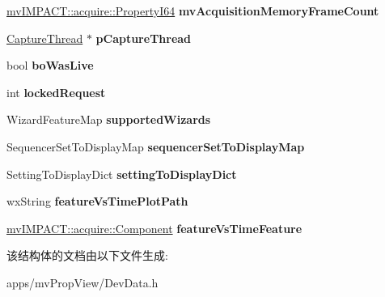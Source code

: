 \begin{DoxyCompactItemize}
\item 
\hypertarget{struct_device_data_ace53e0222e59fd8e5cb0c2d84b60f0eb}{\hyperlink{group___common_interface_ga81749b2696755513663492664a18a893}{mv\+I\+M\+P\+A\+C\+T\+::acquire\+::\+Property\+I64} {\bfseries mv\+Acquisition\+Memory\+Frame\+Count}}\label{struct_device_data_ace53e0222e59fd8e5cb0c2d84b60f0eb}

\item 
\hypertarget{struct_device_data_abc9206b7b98a152655be5a3f31e7a9be}{\hyperlink{class_capture_thread}{Capture\+Thread} $\ast$ {\bfseries p\+Capture\+Thread}}\label{struct_device_data_abc9206b7b98a152655be5a3f31e7a9be}

\item 
\hypertarget{struct_device_data_a2aad1b99064e7d1a60874f427db97de6}{bool {\bfseries bo\+Was\+Live}}\label{struct_device_data_a2aad1b99064e7d1a60874f427db97de6}

\item 
\hypertarget{struct_device_data_a968933b3002f09304fa3caa3cdd032b8}{int {\bfseries locked\+Request}}\label{struct_device_data_a968933b3002f09304fa3caa3cdd032b8}

\item 
\hypertarget{struct_device_data_a88101971c4324566651169d882baf05f}{Wizard\+Feature\+Map {\bfseries supported\+Wizards}}\label{struct_device_data_a88101971c4324566651169d882baf05f}

\item 
\hypertarget{struct_device_data_ad9e5ebb64e855bbd6c728a25f30437bc}{Sequencer\+Set\+To\+Display\+Map {\bfseries sequencer\+Set\+To\+Display\+Map}}\label{struct_device_data_ad9e5ebb64e855bbd6c728a25f30437bc}

\item 
\hypertarget{struct_device_data_a70993acd1f4619c9d6cb8afcb12aac42}{Setting\+To\+Display\+Dict {\bfseries setting\+To\+Display\+Dict}}\label{struct_device_data_a70993acd1f4619c9d6cb8afcb12aac42}

\item 
\hypertarget{struct_device_data_a18817b8d303bdc00a4c17b3e3c9d7602}{wx\+String {\bfseries feature\+Vs\+Time\+Plot\+Path}}\label{struct_device_data_a18817b8d303bdc00a4c17b3e3c9d7602}

\item 
\hypertarget{struct_device_data_a648ef0e198ca83fafdc89d2615cd484c}{\hyperlink{classmv_i_m_p_a_c_t_1_1acquire_1_1_component}{mv\+I\+M\+P\+A\+C\+T\+::acquire\+::\+Component} {\bfseries feature\+Vs\+Time\+Feature}}\label{struct_device_data_a648ef0e198ca83fafdc89d2615cd484c}

\end{DoxyCompactItemize}


该结构体的文档由以下文件生成\+:\begin{DoxyCompactItemize}
\item 
apps/mv\+Prop\+View/Dev\+Data.\+h\end{DoxyCompactItemize}
